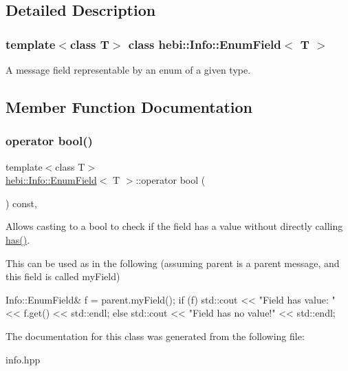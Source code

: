 \subsection{Detailed Description}
\subsubsection*{template$<$class T$>$\newline
class hebi\+::\+Info\+::\+Enum\+Field$<$ T $>$}

A message field representable by an enum of a given type. 

\subsection{Member Function Documentation}
\mbox{\label{classhebi_1_1Info_1_1EnumField_ac1690565ae2d937a18f9c39e3b1111ed}} 
\subsubsection{\texorpdfstring{operator bool()}{operator bool()}}
{\footnotesize\ttfamily template$<$class T$>$ \\
\hyperlink{classhebi_1_1Info_1_1EnumField}{hebi\+::\+Info\+::\+Enum\+Field}$<$ T $>$\+::operator bool (\begin{DoxyParamCaption}{ }\end{DoxyParamCaption}) const\hspace{0.3cm}{\ttfamily [inline]}, {\ttfamily [explicit]}}



Allows casting to a bool to check if the field has a value without directly calling {\ttfamily \hyperlink{classhebi_1_1Info_1_1EnumField_a1c8fe912ecc7e5d7f8f3d8f0fa346ba9}{has()}}. 

This can be used as in the following (assuming \textquotesingle{}parent\textquotesingle{} is a parent message, and this field is called \textquotesingle{}my\+Field\textquotesingle{}) 
\begin{DoxyCode}
Info::EnumField& f = parent.myField();
\textcolor{keywordflow}{if} (f)
  std::cout << \textcolor{stringliteral}{"Field has value: "} << f.get() << std::endl;
\textcolor{keywordflow}{else}
  std::cout << \textcolor{stringliteral}{"Field has no value!"} << std::endl;
\end{DoxyCode}
 

The documentation for this class was generated from the following file\+:\begin{DoxyCompactItemize}
\item 
info.\+hpp\end{DoxyCompactItemize}
